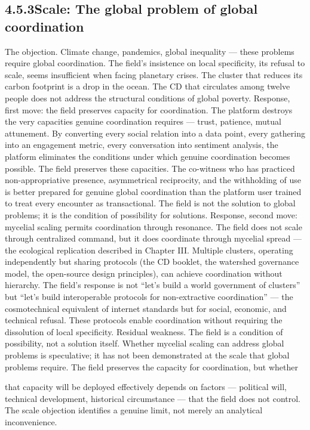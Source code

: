 \subsection{4.5.3\quad Scale: The global problem of global coordination}

The objection. Climate change, pandemics, global inequality — these problems require global coordination. The field’s insistence on local specificity, its refusal to scale, seems insufficient when facing planetary crises. The cluster that reduces its carbon footprint is a drop in the ocean. The CD that circulates among twelve people does not address the structural conditions of global poverty. Response, first move: the field preserves capacity for coordination. The platform destroys the very capacities genuine coordination requires — trust, patience, mutual attunement. By converting every social relation into a data point, every gathering into an engagement metric, every conversation into sentiment analysis, the platform eliminates the conditions under which genuine coordination becomes possible. The field preserves these capacities. The co-witness who has practiced non-appropriative presence, asymmetrical reciprocity, and the withholding of use is better prepared for genuine global coordination than the platform user trained to treat every encounter as transactional. The field is not the solution to global problems; it is the condition of possibility for solutions. Response, second move: mycelial scaling permits coordination through resonance. The field does not scale through centralized command, but it does coordinate through mycelial spread — the ecological replication described in Chapter III. Multiple clusters, operating independently but sharing protocols (the CD booklet, the watershed governance model, the open-source design principles), can achieve coordination without hierarchy. The field’s response is not “let’s build a world government of clusters” but “let’s build interoperable protocols for non-extractive coordination” — the cosmotechnical equivalent of internet standards but for social, economic, and technical refusal. These protocols enable coordination without requiring the dissolution of local specificity. Residual weakness. The field is a condition of possibility, not a solution itself. Whether mycelial scaling can address global problems is speculative; it has not been demonstrated at the scale that global problems require. The field preserves the capacity for coordination, but whether

that capacity will be deployed effectively depends on factors — political will, technical development, historical circumstance — that the field does not control. The scale objection identifies a genuine limit, not merely an analytical inconvenience.

